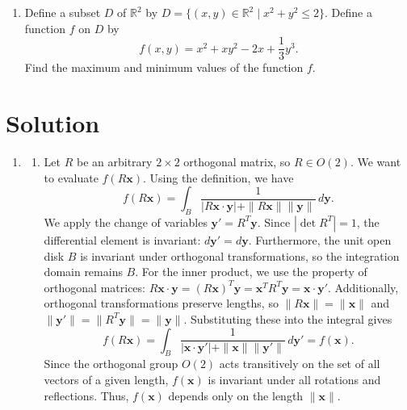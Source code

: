\documentclass{article}
\begin{document}
\begin{enumerate}[label=\fbox{\arabic*}]
  \item Define a subset $D$ of $\mathbb{R}^2$ by $D = \{ (x, y) \in \mathbb{R}^2 \mid x^2 + y^2 \le 2 \}$. Define a function $f$ on $D$ by
        \[
          f(x, y) = x^2 + xy^2 - 2x + \frac{1}{3} y^3.
        \]
        Find the maximum and minimum values of the function $f$.

\end{enumerate}

\newpage
\section*{Solution}
\begin{enumerate}[label=\fbox{\arabic*}]
  \item %
        \begin{enumerate}[label=(\arabic*)]
          \item Let $R$ be an arbitrary $2 \times 2$ orthogonal matrix, so $R \in O(2)$. We want to evaluate $f(R\bm{x})$. 
          Using the definition, we have
          \[
            f(R\bm{x}) = \int_B \frac{1}{|R\bm{x} \cdot \bm{y}| + \|R\bm{x}\| \|\bm{y}\|} \, d\bm{y}.
          \]
          We apply the change of variables $\bm{y}' = R^T \bm{y}$. Since $|\det R^T| = 1$, the differential element is invariant: $d\bm{y}' = d\bm{y}$. Furthermore, the unit open disk $B$ is invariant under orthogonal transformations, so the integration domain remains $B$.
          For the inner product, we use the property of orthogonal matrices: $R\bm{x} \cdot \bm{y} = (R\bm{x})^T \bm{y} = \bm{x}^T R^T \bm{y} = \bm{x} \cdot \bm{y}'$. 
          Additionally, orthogonal transformations preserve lengths, so $\|R\bm{x}\| = \|\bm{x}\|$ and $\|\bm{y}'\| = \|R^T \bm{y}\| = \|\bm{y}\|$. 
          Substituting these into the integral gives
          \[
            f(R\bm{x}) = \int_B \frac{1}{|\bm{x} \cdot \bm{y}'| + \|\bm{x}\| \|\bm{y}'\|} \, d\bm{y}' = f(\bm{x}).
          \]
          Since the orthogonal group $O(2)$ acts transitively on the set of all vectors of a given length, $f(\bm{x})$ is invariant under all rotations and reflections. Thus, $f(\bm{x})$ depends only on the length $\|\bm{x}\|$.
          

\end{enumerate}
\end{enumerate}
\end{document}
